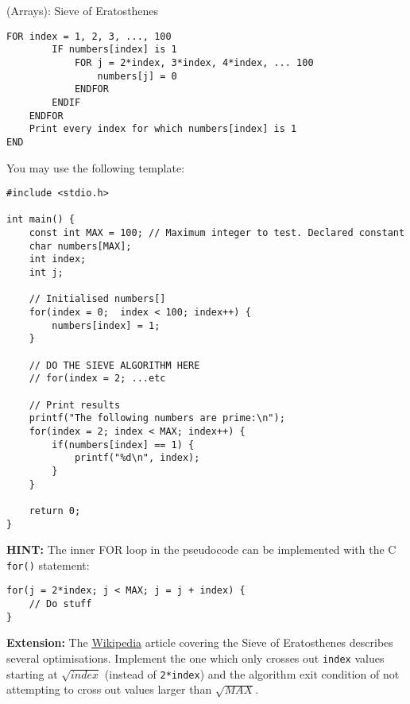 \documentclass{lab}
\begin{document}
\begin{task}{(Arrays): Sieve of Eratosthenes}{}
\begin{lstlisting}[style=pseudo]
	FOR index = 1, 2, 3, ..., 100
		IF numbers[index] is 1
			FOR j = 2*index, 3*index, 4*index, ... 100
				numbers[j] = 0
			ENDFOR
		ENDIF
	ENDFOR
	Print every index for which numbers[index] is 1
END
\end{lstlisting}

You may use the following template:
\begin{lstlisting}[style=Ctable]
#include <stdio.h>

int main() {
	const int MAX = 100; // Maximum integer to test. Declared constant
	char numbers[MAX];
	int index;
	int j;

	// Initialised numbers[]
	for(index = 0;	index < 100; index++) {
		numbers[index] = 1;
	}

	// DO THE SIEVE ALGORITHM HERE
	// for(index = 2; ...etc
	
	// Print results
	printf("The following numbers are prime:\n");
	for(index = 2; index < MAX; index++) {
		if(numbers[index] == 1) {
			printf("%d\n", index);
		}
	}
	
	return 0;
}
\end{lstlisting}
\textbf{HINT:} The inner FOR loop in the pseudocode can be implemented with the C \texttt{for()} statement:
\begin{lstlisting}[style=Ctable]
for(j = 2*index; j < MAX; j = j + index) {
	// Do stuff
}
\end{lstlisting}
\textbf{Extension:} The \underline{\href{https://en.wikipedia.org/wiki/Sieve_of_Eratosthenes}{Wikipedia}} article covering the Sieve of Eratosthenes describes several optimisations. Implement the one which only crosses out \texttt{index} values starting at $\sqrt{index}$ (instead of \texttt{2*index}) and the algorithm exit condition of not attempting to cross out values larger than $\sqrt{MAX}$.
\end{task}
\end{document}
